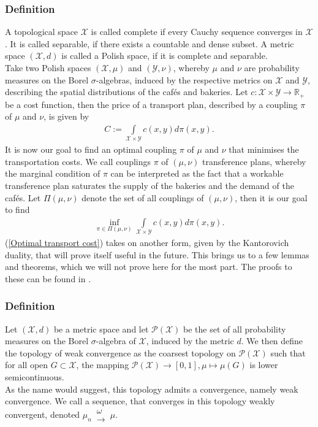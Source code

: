 \documentclass[11pt,a4paper]{article}
\begin{document}
\subsubsection{Definition}
A topological space $\mathcal{X}$ is called complete if every Cauchy sequence converges in $\mathcal{X}$. It is called separable, if there exists a countable and dense subset. A metric space $(\mathcal{X},d)$ is called a Polish space, if it is complete and separable.\vspace{1em}\\
Take two Polish spaces $(\mathcal{X},\mu)$ and $(\mathcal{Y},\nu)$, whereby $\mu$ and $\nu$ are probability measures on the Borel $\sigma$-algebras, induced by the respective metrics on $\mathcal{X}$ and $\mathcal{Y}$, describing the spatial distributions of the cafés and bakeries. Let $c:\mathcal{X\times{}Y}\rightarrow\mathbb{R}_{+}$ be a cost function, then the price of a transport plan, described by a coupling $\pi$ of $\mu$ and $\nu$, is given by 
\begin{align*}
C:=\int\limits_{\mathcal{X\times{}Y}}c(x,y)d\pi(x,y).
\end{align*}
It is now our goal to find an optimal coupling $\pi$ of $\mu$ and $\nu$ that minimises the transportation costs. We call couplings $\pi$ of $(\mu,\nu)$ transference plans, whereby the marginal condition of $\pi$ can be interpreted as the fact that a workable transference plan saturates the supply of the bakeries and the demand of the cafés. Let $\Pi(\mu,\nu)$ denote the set of all couplings of $(\mu,\nu)$, then it is our goal to find
\begin{align}
\inf\limits_{\pi\in\Pi(\mu,\nu)}\int\limits_{\mathcal{X\times{}Y}}c(x,y)d\pi(x,y).
\label{Optimal transport cost}
\end{align}
(\ref{Optimal transport cost}) takes on another form, given by the Kantorovich duality, that will prove itself useful in the future. This brings us to a few lemmas and theorems, which we will not prove here for the most part. The proofs to these can be found in \cite{Villani}.
\subsubsection{Definition}
Let $(\mathcal{X},d)$ be a metric space and let $\mathcal{P(X)}$ be the set of all probability measures on the Borel $\sigma$-algebra of $\mathcal{X}$, induced by the metric $d$. We then define the topology of weak convergence as the coarsest topology on $\mathcal{P(X)}$ such that for all open $G\subset\mathcal{X}$, the mapping $\mathcal{P(X)}\rightarrow{}[0,1],\mu\mapsto\mu(G)$ is lower semicontinuous.\vspace{1em}\\ As the name would suggest, this topology admits a convergence, namely weak convergence. We call a sequence, that converges in this topology weakly convergent, denoted $\mu_n\,\substack{\omega \\ \longrightarrow}\,\mu.$
\end{document}

